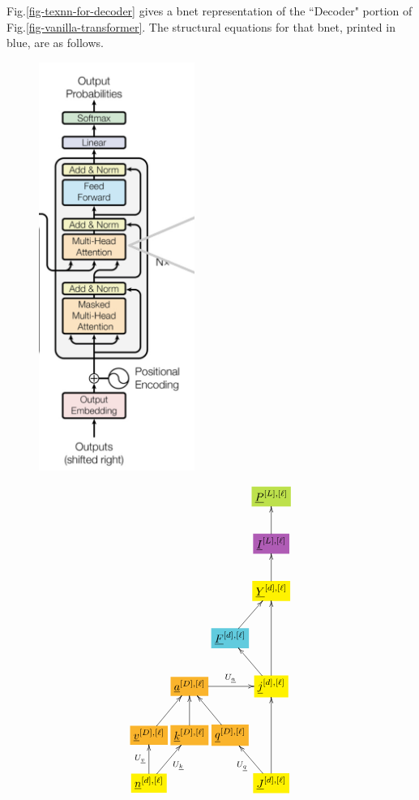 Fig.\ref{fig-texnn-for-decoder}
gives a
bnet representation of
the ``Decoder"
portion of Fig.\ref{fig-vanilla-transformer}.
The structural equations for that bnet,
printed in blue, are as follows.

\begin{figure}[h!]\centering
\begin{minipage}{.4\linewidth}
\includegraphics[width=2in]{transformer/decoder.jpg}
\end{minipage}%
\begin{minipage}{.6\linewidth}
$$\xymatrix@R=2pc@C=0.2pc{
&&&*+[F*:SpringGreen]{\underline{P}^{[L],[\ell]}}
\\
&&&*+[F*:Orchid]{\underline{I}^{[L],[\ell]}}\ar[u]
\\
&&&*+[F*:yellow]{\underline{Y}^{[d], [\ell]}}\ar[u]
\\
&&*+[F*:SkyBlue]{\underline{F}^{[d], [\ell]}}\ar[ur]&
\\
&*+[F*:Dandelion]{\underline{a}^{[D],[\ell]}}\ar[rr]^{U_\rva}&&*+[F*:yellow]{\underline{j}^{[d], [\ell]}}\ar[ul]\ar[uu]
\\
*+[F*:Dandelion]{\underline{v}^{[D], [\ell]}}\ar[ur]&*+[F*:Dandelion]{\underline{k}^{[D], [\ell]}}\ar[u]&*+[F*:Dandelion]{\underline{q}^{[D], [\ell]}}\ar[ul]&
\\
*+[F*:yellow]{\underline{n}^{[d], [\ell]}}\ar[ur]_{U_\rvk}\ar[u]^{U_\rvv}&&&*+[F*:yellow]{\underline{J}^{[d], [\ell]}}\ar[uu]\ar[ul]^{U_\rvq}
}$$
\end{minipage}
\end{figure}
